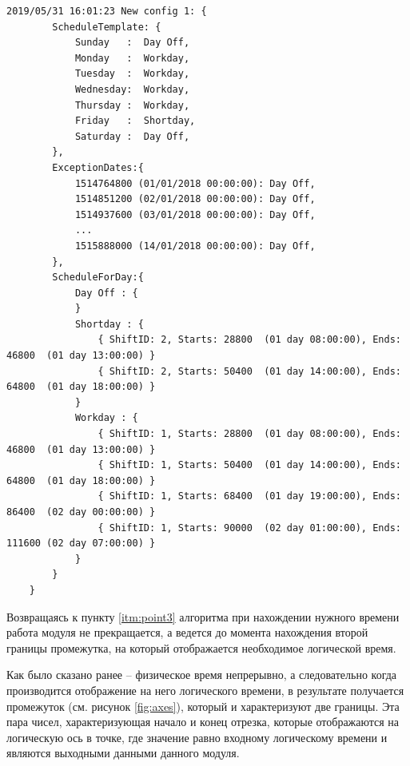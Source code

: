 \begin{lstlisting}[caption={Пример конфигурации},label={lst:config}]
	2019/05/31 16:01:23 New config 1: {
		ScheduleTemplate: {
			Sunday   :	Day Off,
			Monday   :	Workday,
			Tuesday  :	Workday,
			Wednesday:	Workday,
			Thursday :	Workday,
			Friday   :	Shortday,
			Saturday :	Day Off,
		},
		ExceptionDates:{
			1514764800 (01/01/2018 00:00:00): Day Off,
			1514851200 (02/01/2018 00:00:00): Day Off,
			1514937600 (03/01/2018 00:00:00): Day Off,
			...
			1515888000 (14/01/2018 00:00:00): Day Off,
		},
		ScheduleForDay:{
			Day Off : {
			}
			Shortday : {
				{ ShiftID: 2, Starts: 28800  (01 day 08:00:00), Ends: 46800  (01 day 13:00:00) }
				{ ShiftID: 2, Starts: 50400  (01 day 14:00:00), Ends: 64800  (01 day 18:00:00) }
			}
			Workday : {
				{ ShiftID: 1, Starts: 28800  (01 day 08:00:00), Ends: 46800  (01 day 13:00:00) }
				{ ShiftID: 1, Starts: 50400  (01 day 14:00:00), Ends: 64800  (01 day 18:00:00) }
				{ ShiftID: 1, Starts: 68400  (01 day 19:00:00), Ends: 86400  (02 day 00:00:00) }
				{ ShiftID: 1, Starts: 90000  (02 day 01:00:00), Ends: 111600 (02 day 07:00:00) }
			}
		}
	}
\end{lstlisting}

\indent Возвращаясь к пункту \ref{itm:point3} алгоритма при нахождении нужного времени работа модуля не прекращается, а ведется до момента нахождения второй границы промежутка, на который отображается необходимое логической время.

\indent Как было сказано ранее -- физическое время непрерывно, а следовательно когда производится отображение на него логического времени, в результате получается промежуток (см. рисунок \ref{fig:axes}), который и характеризуют две границы.
Эта пара чисел, характеризующая начало и конец отрезка, которые отображаются на логическую ось в точке, где значение равно входному логическому времени и являются выходными данными данного модуля.

